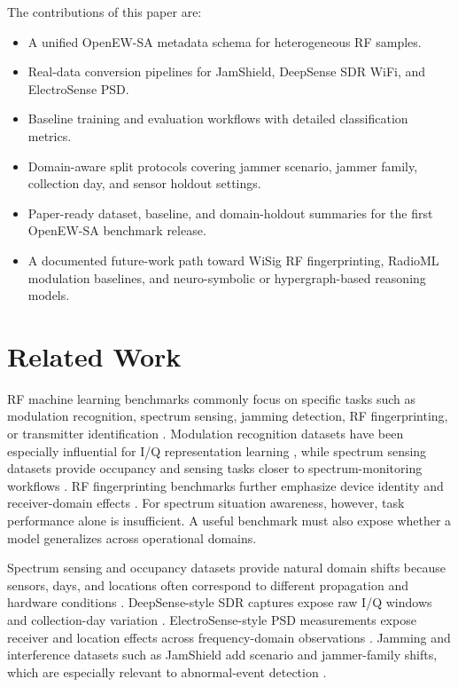 \documentclass[11pt]{article}
\begin{document}
The contributions of this paper are:
\begin{itemize}
  \item A unified OpenEW-SA metadata schema for heterogeneous RF samples.
  \item Real-data conversion pipelines for JamShield, DeepSense SDR WiFi, and ElectroSense PSD.
  \item Baseline training and evaluation workflows with detailed classification metrics.
  \item Domain-aware split protocols covering jammer scenario, jammer family, collection day, and sensor holdout settings.
  \item Paper-ready dataset, baseline, and domain-holdout summaries for the first OpenEW-SA benchmark release.
  \item A documented future-work path toward WiSig RF fingerprinting, RadioML modulation baselines, and neuro-symbolic or hypergraph-based reasoning models.
\end{itemize}

\section{Related Work}

RF machine learning benchmarks commonly focus on specific tasks such as modulation recognition, spectrum sensing, jamming detection, RF fingerprinting, or transmitter identification \cite{hall2019referenceRfDatasets,boegner2022largeScaleRfClassification}. Modulation recognition datasets have been especially influential for I/Q representation learning \cite{oshea2016convolutionalRadioModulation,deepsig2016radioml2016a}, while spectrum sensing datasets provide occupancy and sensing tasks closer to spectrum-monitoring workflows \cite{uvaydov2021deepsense,rajendran2017electrosenseOpenBig}. RF fingerprinting benchmarks further emphasize device identity and receiver-domain effects \cite{hanna2022wisig,coreslab2022wisigDataset}. For spectrum situation awareness, however, task performance alone is insufficient. A useful benchmark must also expose whether a model generalizes across operational domains.

Spectrum sensing and occupancy datasets provide natural domain shifts because sensors, days, and locations often correspond to different propagation and hardware conditions \cite{uvaydov2021deepsense,rajendran2017electrosenseOpenBig}. DeepSense-style SDR captures expose raw I/Q windows and collection-day variation \cite{uvaydov2021deepsense,wiotlab2021deepsenseGithub}. ElectroSense-style PSD measurements expose receiver and location effects across frequency-domain observations \cite{scalingi2023wirelessTechnologyClassification,scalingi2023electrosensePsdDataset,rajendran2017electrosenseOpenBig}. Jamming and interference datasets such as JamShield add scenario and jammer-family shifts, which are especially relevant to abnormal-event detection \cite{panitsas2025jamshield,panitsas2024jamshieldDatasetGithub,panitsas2024jamshieldDatasetDataport}.
\end{document}
